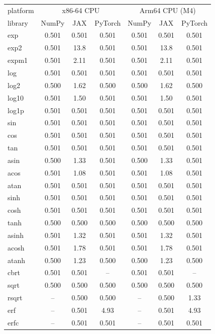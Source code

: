 \begin{table}
\centering
\begin{small}
\begin{tabular}{|l|ccc|ccc|}
\hline
platform & \multicolumn{3}{c|}{x86-64 CPU} & \multicolumn{3}{c|}{Arm64 CPU (M4)} \\
library & NumPy & JAX & PyTorch & NumPy & JAX & PyTorch \\ \hline
exp & 0.501 & 0.501 & 0.501 & 0.501 & 0.501 & 0.501 \\
exp2 & 0.501 & 13.8 & 0.501 & 0.501 & 13.8 & 0.501 \\
expm1 & 0.501 & 2.11 & 0.501 & 0.501 & 2.11 & 0.501 \\
log & 0.501 & 0.501 & 0.501 & 0.501 & 0.501 & 0.501 \\
log2 & 0.500 & 1.62 & 0.500 & 0.500 & 1.62 & 0.500 \\
log10 & 0.501 & 1.50 & 0.501 & 0.501 & 1.50 & 0.501 \\
log1p & 0.501 & 0.501 & 0.501 & 0.501 & 0.501 & 0.501 \\
sin & 0.501 & 0.501 & 0.501 & 0.501 & 0.501 & 0.501 \\
cos & 0.501 & 0.501 & 0.501 & 0.501 & 0.501 & 0.501 \\
tan & 0.501 & 0.501 & 0.501 & 0.501 & 0.501 & 0.501 \\
asin & 0.500 & 1.33 & 0.501 & 0.500 & 1.33 & 0.501 \\
acos & 0.501 & 1.08 & 0.501 & 0.501 & 1.08 & 0.501 \\
atan & 0.501 & 0.501 & 0.501 & 0.501 & 0.501 & 0.501 \\
sinh & 0.501 & 0.501 & 0.501 & 0.501 & 0.501 & 0.501 \\
cosh & 0.501 & 0.501 & 0.501 & 0.501 & 0.501 & 0.501 \\
tanh & 0.500 & 0.500 & 0.500 & 0.500 & 0.500 & 0.500 \\
asinh & 0.501 & 1.32 & 0.501 & 0.501 & 1.32 & 0.501 \\
acosh & 0.501 & 1.78 & 0.501 & 0.501 & 1.78 & 0.501 \\
atanh & 0.500 & 1.23 & 0.500 & 0.500 & 1.23 & 0.500 \\
cbrt & 0.501 & 0.501 & -- & 0.501 & 0.501 & -- \\
sqrt & 0.500 & 0.500 & 0.500 & 0.500 & 0.500 & 0.500 \\
rsqrt & -- & 0.500 & 0.500 & -- & 0.500 & 1.33 \\
erf & -- & 0.501 & 4.93 & -- & 0.501 & 4.93 \\
erfc & -- & 0.501 & 0.501 & -- & 0.501 & 0.501 \\

\end{tabular}
\end{small}
\end{table}
